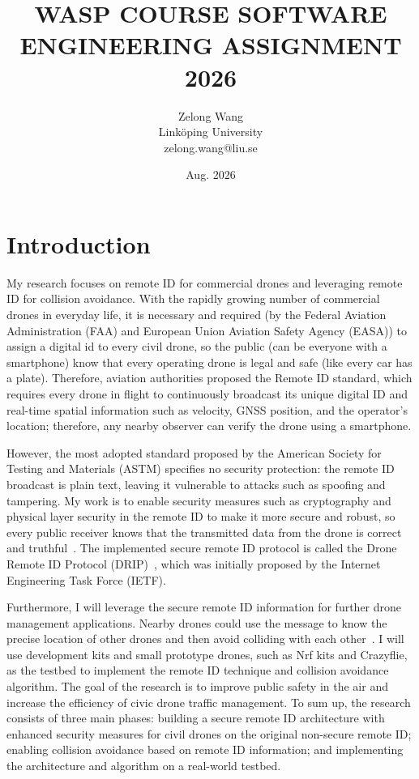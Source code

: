 \documentclass[11pt]{article}
\title{WASP COURSE SOFTWARE ENGINEERING ASSIGNMENT 2026}
\author{Zelong Wang\\Linköping University\\zelong.wang@liu.se}
\date{Aug. 2026}
\begin{document}
\maketitle

\section{Introduction}
My research focuses on remote ID for commercial drones and leveraging remote ID for collision avoidance. With the rapidly growing number of commercial drones in everyday life, it is necessary and required (by the Federal Aviation Administration (FAA) and European Union Aviation Safety Agency (EASA)) to assign a digital id to every civil drone, so the public (can be everyone with a smartphone) know that every operating drone is legal and safe (like every car has a plate). Therefore, aviation authorities proposed the Remote ID standard, which requires every drone in flight to continuously broadcast its unique digital ID and real-time spatial information such as velocity, GNSS position, and the operator's location; therefore, any nearby observer can verify the drone using a smartphone.

However, the most adopted standard proposed by the American Society for Testing and Materials (ASTM) specifies no security protection: the remote ID broadcast is plain text, leaving it vulnerable to attacks such as spoofing and tampering. My work is to enable security measures such as cryptography and physical layer security in the remote ID to make it more secure and robust, so every public receiver knows that the transmitted data from the drone is correct and truthful~\cite{survey_rid}. The implemented secure remote ID protocol is called the Drone Remote ID Protocol (DRIP)~\cite{card2022drone,formal_verification}, which was initially proposed by the Internet Engineering Task Force (IETF). 

Furthermore, I will leverage the secure remote ID information for further drone management applications. Nearby drones could use the message to know the precise location of other drones and then avoid colliding with each other~\cite{trustbased_ca}. I will use development kits and small prototype drones, such as Nrf kits and Crazyflie, as the testbed to implement the remote ID technique and collision avoidance algorithm. The goal of the research is to improve public safety in the air and increase the efficiency of civic drone traffic management. To sum up, the research consists of three main phases: building a secure remote ID architecture with enhanced security measures for civil drones on the original non-secure remote ID; enabling collision avoidance based on remote ID information; and implementing the architecture and algorithm on a real-world testbed.
\end{document}
